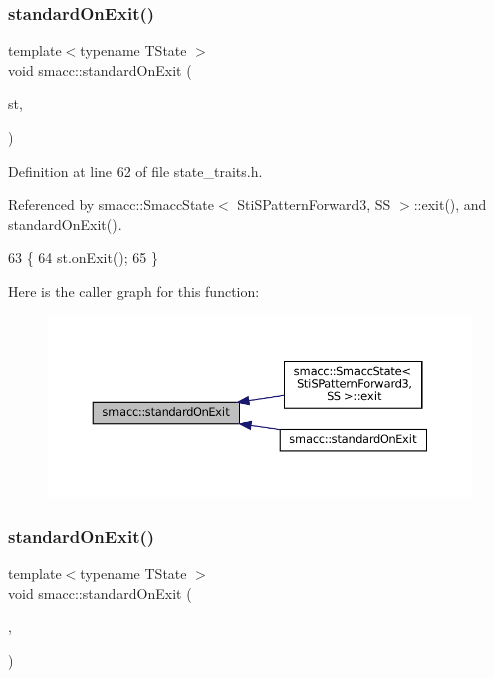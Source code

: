\subsubsection{\texorpdfstring{standard\+On\+Exit()}{standardOnExit()}\hspace{0.1cm}{\footnotesize\ttfamily [1/3]}}
{\footnotesize\ttfamily template$<$typename T\+State $>$ \\
void smacc\+::standard\+On\+Exit (\begin{DoxyParamCaption}\item[{T\+State \&}]{st,  }\item[{std\+::true\+\_\+type}]{ }\end{DoxyParamCaption})}



Definition at line 62 of file state\+\_\+traits.\+h.



Referenced by smacc\+::\+Smacc\+State$<$ Sti\+S\+Pattern\+Forward3, S\+S $>$\+::exit(), and standard\+On\+Exit().


\begin{DoxyCode}
63     \{
64         st.onExit();
65     \}
\end{DoxyCode}
Here is the caller graph for this function\+:
\nopagebreak
\begin{figure}[H]
\begin{center}
\leavevmode
\includegraphics[width=350pt]{namespacesmacc_ab3aebd999834404be47a62ea03aacfc9_icgraph}
\end{center}
\end{figure}
\mbox{\label{namespacesmacc_a17d9a98b5ae8bbeea7dc632105731e25}} 
\subsubsection{\texorpdfstring{standard\+On\+Exit()}{standardOnExit()}\hspace{0.1cm}{\footnotesize\ttfamily [2/3]}}
{\footnotesize\ttfamily template$<$typename T\+State $>$ \\
void smacc\+::standard\+On\+Exit (\begin{DoxyParamCaption}\item[{T\+State \&}]{,  }\item[{std\+::false\+\_\+type}]{ }\end{DoxyParamCaption})}



